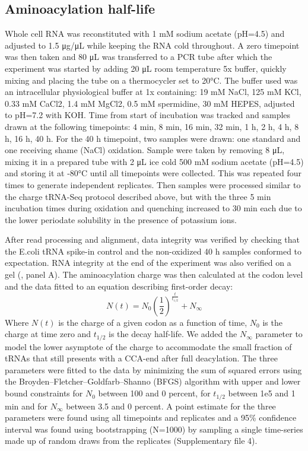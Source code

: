 \documentclass[9pt,lineno]{elife}
\begin{document}
\subsection{Aminoacylation half-life}
Whole cell RNA was reconstituted with 1 mM sodium acetate (pH=4.5) and adjusted to 1.5 μg/μL while keeping the RNA cold throughout.
A zero timepoint was then taken and 80 μL was transferred to a PCR tube after which the experiment was started by adding 20 μL room temperature 5x buffer, quickly mixing and placing the tube on a thermocycler set to 20°C.
The buffer used was an intracellular physiological buffer at 1x containing: 19 mM NaCl, 125 mM KCl, 0.33 mM CaCl2, 1.4 mM MgCl2, 0.5 mM spermidine, 30 mM HEPES, adjusted to pH=7.2 with KOH.
Time from start of incubation was tracked and samples drawn at the following timepoints: 4 min, 8 min, 16 min, 32 min, 1 h, 2 h, 4 h, 8 h, 16 h, 40 h.
For the 40 h timepoint, two samples were drawn: one standard and one receiving shame (NaCl) oxidation.
Sample were taken by removing 8 μL, mixing it in a prepared tube with 2 μL ice cold 500 mM sodium acetate (pH=4.5) and storing it at -80°C until all timepoints were collected.
This was repeated four times to generate independent replicates.
Then samples were processed similar to the charge tRNA-Seq protocol described above, but with the three 5 min incubation times during oxidation and quenching increased to 30 min each due to the lower periodate solubility in the presence of potassium ions.

After read processing and alignment, data integrity was verified by checking that the E.coli tRNA spike-in control and the non-oxidized 40 h samples conformed to expectation.
RNA integrity at the end of the experiment was also verified on a gel (, panel A).
The aminoacylation charge was then calculated at the codon level and the data fitted to an equation describing first-order decay:
\begin{equation}
N(t) = N_0 \left( \frac{1}{2} \right) ^\frac{t}{t_{1/2}} + N_{\infty}
\end{equation}
Where $N(t)$ is the charge of a given codon as a function of time, $N_0$ is the charge at time zero and $t_{1/2}$ is the decay half-life.
We added the $N_{\infty}$ parameter to model the lower asymptote of the charge to accommodate the small fraction of tRNAs that still presents with a CCA-end after full deacylation.
The three parameters were fitted to the data by minimizing the sum of squared errors using the Broyden–Fletcher–Goldfarb–Shanno (BFGS) algorithm with upper and lower bound constraints for $N_0$ between 100 and 0 percent, for $t_{1/2}$ between 1e5 and 1 min and for $N_{\infty}$ between 3.5 and 0 percent.
A point estimate for the three parameters were found using all timepoints and replicates and a 95\% confidence interval was found using bootstrapping (N=1000) by sampling a single time-series made up of random draws from the replicates (Supplementary file 4).
\end{document}
